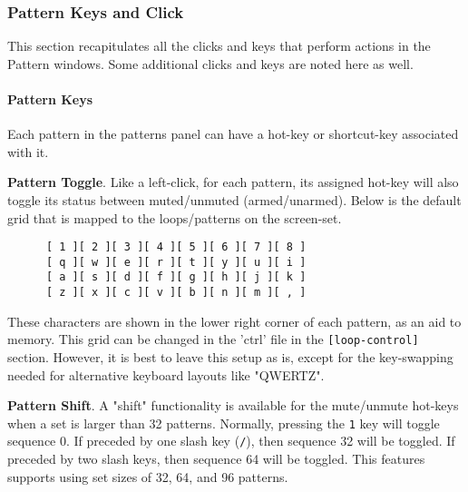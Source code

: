 


\subsubsection{Pattern Keys and Click}
\label{subsubsec:patterns_pattern_keys_and_clicks}

   This section recapitulates all the clicks and keys that perform actions
   in the Pattern windows.  Some additional clicks and keys are noted here
   as well.

\paragraph{Pattern Keys}
\label{paragraph:patterns_pattern_keys}

   Each pattern in the patterns panel can have a hot-key or shortcut-key
   associated with it.

   \textbf{Pattern Toggle}.
   Like a left-click, for each pattern, its assigned hot-key will
   also toggle its status between muted/unmuted (armed/unarmed).
   Below is the default grid that is
   mapped to the loops/patterns on the screen-set.

   \begin{verbatim}
      [ 1 ][ 2 ][ 3 ][ 4 ][ 5 ][ 6 ][ 7 ][ 8 ]
      [ q ][ w ][ e ][ r ][ t ][ y ][ u ][ i ]
      [ a ][ s ][ d ][ f ][ g ][ h ][ j ][ k ]
      [ z ][ x ][ c ][ v ][ b ][ n ][ m ][ , ]
   \end{verbatim}

   These characters are shown in the lower right corner of each
   pattern, as an aid to memory.
   This grid can be changed in the 'ctrl' file in the
   \texttt{[loop-control]} section.
   However, it is best to leave this setup as is, except for the key-swapping
   needed for alternative keyboard layouts like "QWERTZ".

   \textbf{Pattern Shift}.
   A "shift" functionality is available for the
   mute/unmute hot-keys when a set is larger than 32 patterns.
   Normally, pressing the \texttt{1} key will toggle
   sequence 0.  If preceded by one slash key (\texttt{/}), then sequence 32
   will be toggled.  If preceded by two slash keys, then sequence 64 will be
   toggled.  This features supports using set sizes of 32, 64, and 96 patterns.

